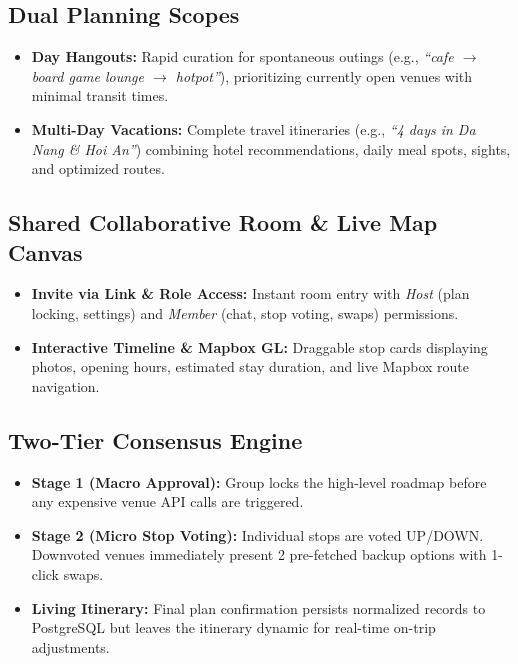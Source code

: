 \documentclass[11pt,a4paper]{article}
\begin{document}
\subsection{Dual Planning Scopes}
\begin{itemize}
\item \textbf{Day Hangouts:} Rapid curation for spontaneous outings (e.g., \textit{``cafe $\rightarrow$ board game lounge $\rightarrow$ hotpot''}), prioritizing currently open venues with minimal transit times.
\item \textbf{Multi-Day Vacations:} Complete travel itineraries (e.g., \textit{``4 days in Da Nang \& Hoi An''}) combining hotel recommendations, daily meal spots, sights, and optimized routes.
\end{itemize}

\subsection{Shared Collaborative Room \& Live Map Canvas}
\begin{itemize}
\item \textbf{Invite via Link \& Role Access:} Instant room entry with \textit{Host} (plan locking, settings) and \textit{Member} (chat, stop voting, swaps) permissions.
\item \textbf{Interactive Timeline \& Mapbox GL:} Draggable stop cards displaying photos, opening hours, estimated stay duration, and live Mapbox route navigation.
\end{itemize}

\subsection{Two-Tier Consensus Engine}
\label{sec:consensus}
\begin{itemize}
\item \textbf{Stage 1 (Macro Approval):} Group locks the high-level roadmap before any expensive venue API calls are triggered.
\item \textbf{Stage 2 (Micro Stop Voting):} Individual stops are voted UP/DOWN. Downvoted venues immediately present 2 pre-fetched backup options with 1-click swaps.
\item \textbf{Living Itinerary:} Final plan confirmation persists normalized records to PostgreSQL but leaves the itinerary dynamic for real-time on-trip adjustments.
\end{itemize}

\clearpage
\end{document}

